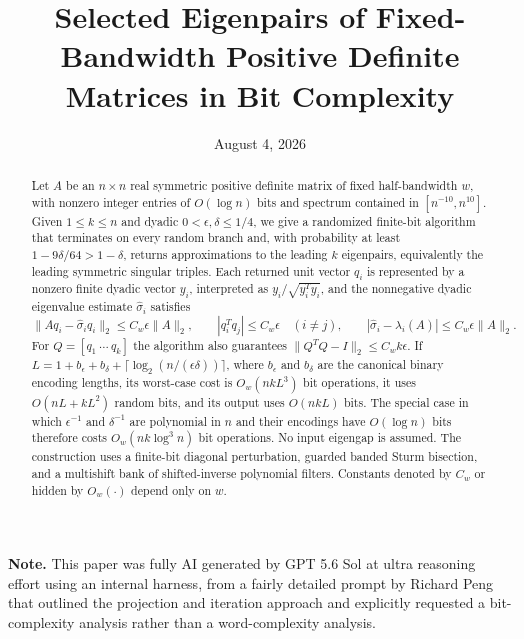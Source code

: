 \documentclass[11pt]{article}
\title{Selected Eigenpairs of Fixed-Bandwidth Positive Definite Matrices in Bit Complexity}
\author{}
\date{August 4, 2026}
\begin{document}

\maketitle

\begin{abstract}
Let $A$ be an $n\times n$ real symmetric positive definite matrix of fixed
half-bandwidth $w$, with nonzero integer entries of $O(\log n)$ bits and
spectrum contained in $[n^{-10},n^{10}]$.  Given $1\leq k\leq n$ and dyadic
$0<\epsilon,\delta\leq1/4$, we give a randomized finite-bit algorithm that
terminates on every random branch and, with probability at least
$1-9\delta/64>1-\delta$, returns approximations to the leading $k$
eigenpairs, equivalently the leading symmetric singular triples.  Each
returned unit vector $q_i$ is represented by a nonzero
finite dyadic vector $y_i$, interpreted as $y_i/\sqrt{y_i^Ty_i}$, and the
nonnegative dyadic eigenvalue estimate $\widehat\sigma_i$ satisfies
\[
 \lVert Aq_i-\widehat\sigma_iq_i\rVert_2
   \leq C_w\epsilon\lVert A\rVert_2,
 \qquad
 |q_i^Tq_j|\leq C_w\epsilon\quad(i\ne j),
 \qquad
 |\widehat\sigma_i-\lambda_i(A)|
   \leq C_w\epsilon\lVert A\rVert_2.
\]
For $Q=[q_1\ \cdots\ q_k]$ the algorithm also guarantees
$\lVert Q^TQ-I\rVert_2\leq C_wk\epsilon$.  If
$L=1+b_\epsilon+b_\delta+\lceil\log_2(n/(\epsilon\delta))\rceil$, where
$b_\epsilon$ and $b_\delta$ are the canonical binary encoding lengths, its
worst-case cost is $O_w(nkL^3)$ bit operations, it uses
$O(nL+kL^2)$ random bits, and its output uses $O(nkL)$ bits.  The
special case in which $\epsilon^{-1}$ and $\delta^{-1}$ are polynomial in
$n$ and their encodings have $O(\log n)$ bits therefore costs
$O_w(nk\log^3 n)$ bit operations.  No input eigengap is assumed.  The
construction uses a finite-bit diagonal perturbation, guarded banded Sturm
bisection, and a multishift bank of shifted-inverse polynomial filters.
Constants denoted by $C_w$ or hidden by $O_w(\cdot)$ depend only on $w$.
\end{abstract}

\noindent\textbf{Note.} This paper was fully AI generated by GPT 5.6 Sol at
ultra reasoning effort using an internal harness, from a fairly detailed prompt
by Richard Peng that outlined the projection and iteration approach and
explicitly requested a bit-complexity analysis rather than a word-complexity
analysis.

\clearpage
\tableofcontents
\clearpage

\end{document}
